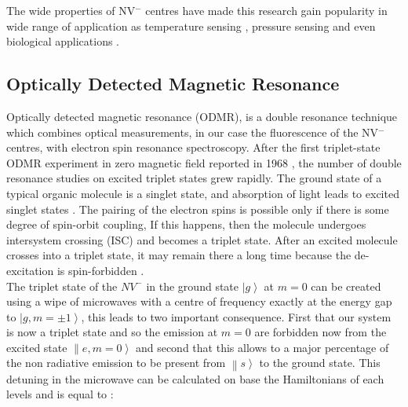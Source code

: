 The wide properties of NV$^{-}$ centres have made this research gain popularity in wide range of application as temperature sensing \cite{neumann_high-precision_2013}, pressure sensing \cite{doherty_electronic_2014} and even biological applications \cite{mcguinness_quantum_2011}.


\subsection{Optically Detected Magnetic Resonance}
\label{sec:odmr}

Optically detected magnetic resonance (ODMR), is  a  double  resonance  technique  which  combines  optical measurements, in our case the fluorescence of the NV$^{-}$ centres, with  electron  spin  resonance  spectroscopy.  After  the  first triplet-state ODMR experiment in zero magnetic field reported  in 1968 \cite{schmidt_optical_1967}, the  number  of double resonance studies on excited triplet states grew rapidly.  The ground state of a typical organic molecule is a singlet state, and absorption of light leads to excited singlet states \cite{pham_magnetic_nodate}. The pairing of the electron spins is possible only if there is some degree of spin-orbit coupling, If this happens, then the molecule undergoes intersystem crossing (ISC)  and  becomes  a  triplet  state. After an excited molecule crosses into a triplet state, it may remain there a long time because the de-excitation is spin-forbidden \cite{carbonera_optically_2009}.\\

The triplet state of the  $NV^{-}$ in the ground state $\left| g \right\rangle $ at $m=0$ can be created using a wipe of microwaves with a centre of frequency exactly at the energy gap to $\left|g,m=\pm1\right\rangle $, this leads to two important consequence. First that our system is now a triplet state and so the emission at $m=0$ are forbidden now from the excited state $\left\| e,m=0\right\rangle $ and second that this allows to a major percentage of the non radiative emission to be present from $\left\| s\right\rangle $ to the ground state. This detuning in the microwave can be calculated on base the Hamiltonians of each levels and is equal to \cite{schirhagl_nitrogen-vacancy_2014}:\\

